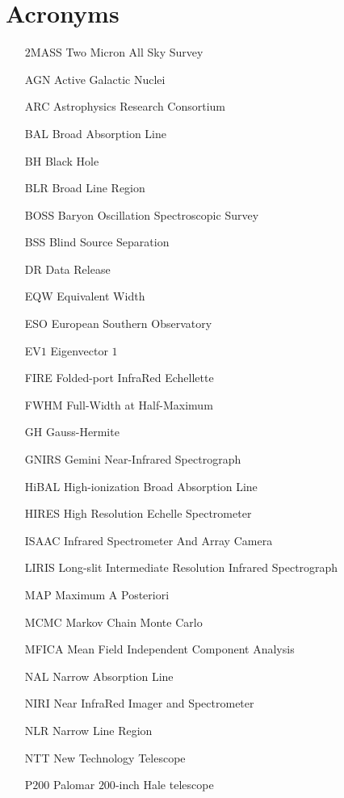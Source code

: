     \chapter*{Acronyms}
    \begin{itemize}
      \item[$2$MASS]{Two Micron All Sky Survey}
      \item[AGN]{Active Galactic Nuclei}
      \item[ARC]{Astrophysics Research Consortium}
      \item[BAL]{Broad Absorption Line}
      \item[BH]{Black Hole}
      \item[BLR]{Broad Line Region}
      \item[BOSS]{Baryon Oscillation Spectroscopic Survey}
      \item[BSS]{Blind Source Separation}
      \item[DR]{Data Release}
      \item[EQW]{Equivalent Width}
      \item[ESO]{European Southern Observatory}
      \item[EV$1$]{Eigenvector $1$}
      \item[FIRE]{Folded-port InfraRed Echellette}
      \item[FWHM]{Full-Width at Half-Maximum}
      \item[GH]{Gauss-Hermite}
      \item[GNIRS]{Gemini Near-Infrared Spectrograph}
      \item[HiBAL]{High-ionization Broad Absorption Line}
      \item[HIRES]{High Resolution Echelle Spectrometer}
      \item[ISAAC]{Infrared Spectrometer And Array Camera}
      \item[LIRIS]{Long-slit Intermediate Resolution Infrared Spectrograph}
      \item[MAP]{Maximum A Posteriori}
      \item[MCMC]{Markov Chain Monte Carlo}
      \item[MFICA]{Mean Field Independent Component Analysis}
      \item[NAL]{Narrow Absorption Line}
      \item[NIRI]{Near InfraRed Imager and Spectrometer}
      \item[NLR]{Narrow Line Region}
      \item[NTT]{New Technology Telescope}
      \item[P$200$]{Palomar $200$-inch Hale telescope}

\end{itemize}
